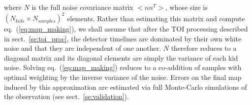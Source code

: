 where $N$ is the full noise covariance matrix $<nn^T>$, whose size is
$(N_{kids}\times N_{samples})^2$ elements. Rather than estimating this matrix
and compute eq.~(\ref{eq:map_making}), we shall assume that after the TOI
processing described in sect.~\ref{se:toi_proc}, the detector timelines are
dominated by their own white noise and that they are independent of one
another. $N$ therefore reduces to a diagonal matrix and its diagonal elements
are simply the variance of each kid noise. Solving eq.~(\ref{eq:map_making})
reduces to a co-addition of samples with optimal weighting by the inverse
variance of the noise. Errors on the final map induced by this approximation are
estimated via full Monte-Carlo simulations of the observation (see
sect.~\ref{se:validation}).


